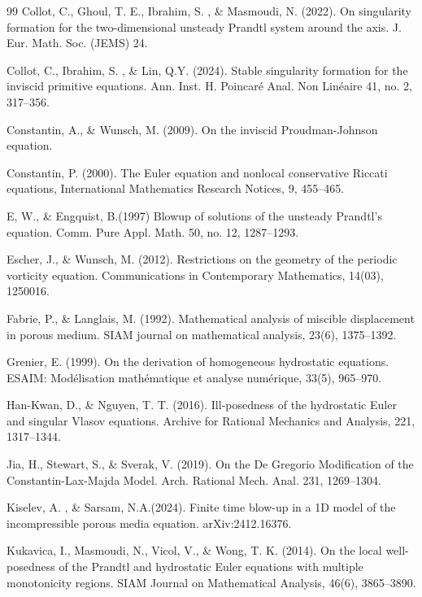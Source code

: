 \documentclass[12pt]{amsart}
\numberwithin{equation}{section}
\numberwithin{equation}{section}
\begin{document}
\begin{thebibliography}{99}
  Collot, C., Ghoul, T. E.,     Ibrahim, S. , \& Masmoudi, N. (2022).  On singularity formation for the two-dimensional unsteady Prandtl system around the axis.  { J.  Eur.  Math.  Soc.  (JEMS)} {24}.

  Collot, C.,   Ibrahim,  S. ,  \& Lin,  Q.Y. (2024).  Stable singularity formation for the inviscid primitive equations.  {  Ann. Inst. H. Poincar\'{e} Anal. Non Lin\'{e}aire} {41},  no. 2,   317--356.


     Constantin, A., \& Wunsch, M. (2009). On the inviscid Proudman-Johnson equation.

 Constantin, P. (2000). The Euler equation and nonlocal conservative Riccati equations,   International Mathematics Research Notices, 9, 455--465.

  { E, W.,  \&  Engquist, B.}(1997) Blowup of solutions of the unsteady Prandtl's equation.  {  Comm. Pure Appl. Math. } {  50},  no. 12, 1287--1293.

 Escher, J., \& Wunsch, M. (2012). Restrictions on the geometry of the periodic vorticity equation. Communications in Contemporary Mathematics, 14(03), 1250016.

 Fabrie, P., \& Langlais, M. (1992). Mathematical analysis of miscible displacement in porous medium. SIAM journal on mathematical analysis, 23(6), 1375--1392.

 Grenier, E. (1999).  On the derivation of homogeneous hydrostatic equations. ESAIM: Mod\'{e}lisation math\'{e}matique et analyse num\'{e}rique, 33(5), 965--970.

 Han-Kwan, D., \& Nguyen, T. T. (2016). Ill-posedness of the hydrostatic Euler and singular Vlasov equations. Archive for Rational Mechanics and Analysis, 221, 1317--1344.

 {  Jia,   H.,    Stewart,  S.,  \&   Sverak, V.} (2019).  On the De Gregorio Modification of the Constantin-Lax-Majda Model.  {  Arch.  Rational Mech.  Anal. } {  231}, 1269--1304.


 { Kiselev,  A. ,  \&   Sarsam, N.A.}(2024).  Finite time blow-up in a 1D model of the incompressible porous media equation.  	arXiv:2412.16376.

 Kukavica, I., Masmoudi, N., Vicol, V., \& Wong, T. K. (2014). On the local well-posedness of the Prandtl and hydrostatic Euler equations with multiple monotonicity regions. SIAM Journal on Mathematical Analysis, 46(6), 3865--3890.


\end{thebibliography}
\end{document}

